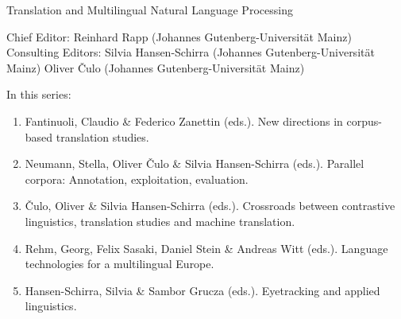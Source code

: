 {\large Translation and Multilingual Natural Language Processing}

\bigskip

Chief Editor: Reinhard Rapp (Johannes Gutenberg-Universität Mainz) \\
Consulting Editors: Silvia Hansen-Schirra (Johannes Gutenberg-Universität Mainz)
Oliver Čulo (Johannes Gutenberg-Universität Mainz)

\bigskip

In this series:

\begin{enumerate}
\item Fantinuoli, Claudio \& Federico Zanettin (eds.). New directions in corpus-based translation studies.
\item Neumann, Stella, Oliver Čulo \& Silvia Hansen-Schirra (eds.). Parallel corpora: Annotation, exploitation, evaluation.
\item Čulo, Oliver  \& Silvia Hansen-Schirra (eds.). Crossroads between contrastive linguistics, translation studies and machine translation.
\item Rehm, Georg, Felix Sasaki, Daniel Stein \& Andreas Witt (eds.). Language technologies for a multilingual Europe. 
\item Hansen-Schirra, Silvia \& Sambor Grucza (eds.). Eyetracking and applied linguistics.
\end{enumerate}

 
